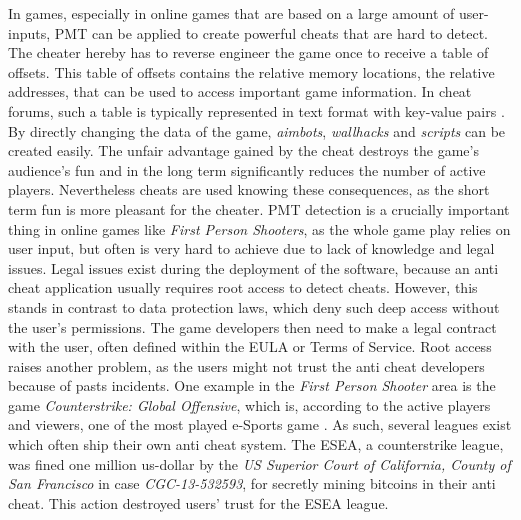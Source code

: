 In games, especially in online games that are based on a large amount of user-inputs, \gls{PMT} can be applied to create powerful cheats that are hard to detect. The cheater hereby has to reverse engineer the game once to receive a table of offsets. This table of offsets contains the relative memory locations, the relative addresses, that can be used to access important game information. In cheat forums, such a table is typically represented in text format with key-value pairs \cite{offsets}. By directly changing the data of the game, \emph{aimbots}, \emph{wallhacks} and \emph{scripts} can be created easily. The unfair advantage gained by the cheat destroys the game's audience's fun and in the long term significantly reduces the number of active players. Nevertheless cheats are used knowing these consequences, as the short term fun is more pleasant for the cheater. \gls{PMT} detection is a crucially important thing in online games like \emph{First Person Shooters}, as the whole game play relies on user input, but often is very hard to achieve due to lack of knowledge and legal issues. Legal issues exist during the deployment of the software, because an anti cheat application usually requires root access to detect cheats. However, this stands in contrast to data protection laws, which deny such deep access without the user's permissions. The game developers then need to make a legal contract with the user, often defined within the \gls{EULA} or Terms of Service. Root access raises another problem, as the users might not trust the anti cheat developers because of pasts incidents. One example in the \emph{First Person Shooter} area is the game \emph{Counterstrike: Global Offensive}, which is, according to the active players and viewers, one of the most played e-Sports game \cite{csgo1, csgo2}. As such, several leagues exist which often ship their own anti cheat system. The \gls{ESEA}, a counterstrike league, was fined one million us-dollar by the \emph{US Superior Court of California, County of San Francisco} \cite{esea} in case \emph{CGC-13-532593}, for secretly mining bitcoins in their anti cheat. This action destroyed users' trust for the \gls{ESEA} league.